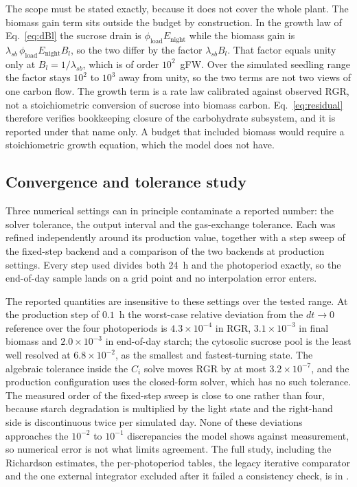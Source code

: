 The scope must be stated exactly, because it does not cover the whole plant.
The biomass gain term sits outside the budget by construction. In the growth law
of Eq.~\eqref{eq:dBl} the sucrose drain is
$\phi_{\text{load}} E_{\text{night}}$ while the biomass gain is
$\lambda_{sb}\,\phi_{\text{load}} E_{\text{night}} B_l$, so the two differ by
the factor $\lambda_{sb} B_l$. That factor equals unity only at
$B_l = 1/\lambda_{sb}$, which is of order $10^{2}$~gFW. Over the simulated
seedling range the factor stays $10^{2}$ to $10^{3}$ away from unity, so the two
terms are not two views of one carbon flow. The growth
term is a rate law calibrated against observed RGR, not a stoichiometric
conversion of sucrose into biomass carbon. Eq.~\eqref{eq:residual} therefore
verifies bookkeeping closure of the carbohydrate subsystem, and it is reported
under that name only. A budget that included biomass would require a
stoichiometric growth equation, which the model does not have.

\subsection{Convergence and tolerance study}

Three numerical settings can in principle contaminate a reported number: the
solver tolerance, the output interval and the gas-exchange tolerance. Each was
refined independently around its production value, together with a step sweep of
the fixed-step backend and a comparison of the two backends at production
settings. Every step used divides both 24~h and the photoperiod exactly, so the
end-of-day sample lands on a grid point and no interpolation error enters.

The reported quantities are insensitive to these settings over the tested range.
At the production step of $0.1$~h the worst-case relative deviation from the
$dt\to0$ reference over the four photoperiods is $4.3\times10^{-4}$ in RGR,
$3.1\times10^{-3}$ in final biomass and $2.0\times10^{-3}$ in end-of-day starch;
the cytosolic sucrose pool is the least well resolved at $6.8\times10^{-2}$, as
the smallest and fastest-turning state. The algebraic tolerance inside the $C_i$
solve moves RGR by at most $3.2\times10^{-7}$, and the production configuration
uses the closed-form solver, which has no such tolerance. The measured order of
the fixed-step sweep is close to one rather than four, because starch degradation
is multiplied by the light state and the right-hand side is discontinuous twice
per simulated day. None of these deviations approaches the $10^{-2}$ to
$10^{-1}$ discrepancies the model shows against measurement, so numerical error
is not what limits agreement. The full study, including the Richardson estimates,
the per-photoperiod tables, the legacy iterative comparator and the one external
integrator excluded after it failed a consistency check, is in
.


